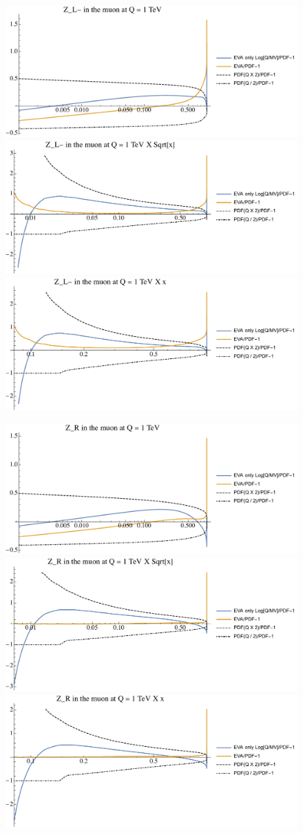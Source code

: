 \documentclass[a4paper,11pt]{article}
\begin{document}
\begin{figure}[ht]
\includegraphics[width=0.4\linewidth]{PlotPDFs/ratios/1TeV/Z_L-_Q.pdf}
\includegraphics[width=0.4\linewidth]{PlotPDFs/ratios/1TeV/Z_L-_Qsqrtx.pdf}
\includegraphics[width=0.4\linewidth]{PlotPDFs/ratios/1TeV/Z_L-_Qx.pdf}
\end{figure}

\begin{figure}[ht]
\includegraphics[width=0.4\linewidth]{PlotPDFs/ratios/1TeV/Z_R_Q.pdf}
\includegraphics[width=0.4\linewidth]{PlotPDFs/ratios/1TeV/Z_R_Qsqrtx.pdf}
\includegraphics[width=0.4\linewidth]{PlotPDFs/ratios/1TeV/Z_R_Qx.pdf}
\end{figure}
\end{document}
